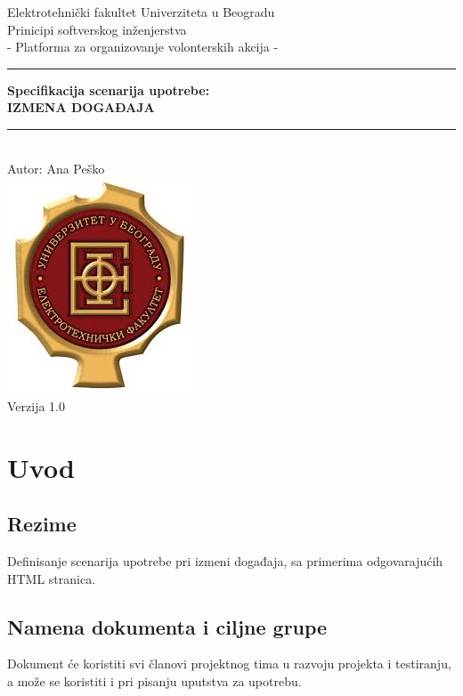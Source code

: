 \documentclass[11pt,a4paper]{article}
\begin{document}
\begin{titlepage}

\centering
\textnormal{\large Elektrotehnički fakultet Univerziteta u Beogradu}\\[0.1cm]
\textnormal{\large Prinicipi softverskog inženjerstva}\\[3cm]

\textnormal{\normalsize - Platforma za organizovanje volonterskih akcija -}\\\vspace{-5mm}
\rule{\textwidth}{0.4pt}
{\huge \bfseries Specifikacija scenarija upotrebe:\\ 
IZMENA DOGAĐAJA\par}\vspace{-1mm}
\rule{\textwidth}{0.4pt}\\\vspace{1mm}
\textnormal{\large Autor: Ana Peško}\\[6cm]

\includegraphics[scale=0.5]{logo.jpg}\\
\vfill
\textnormal{\normalsize Verzija 1.0}\\

\end{titlepage}

\tableofcontents

\newpage

\section{Uvod}
\subsection{Rezime}
Definisanje scenarija upotrebe pri izmeni događaja, sa primerima odgovarajućih HTML stranica.
\subsection{Namena dokumenta i ciljne grupe}
Dokument će koristiti svi članovi projektnog tima u razvoju projekta i testiranju, a može se koristiti i pri pisanju uputstva za upotrebu.
\end{document}
